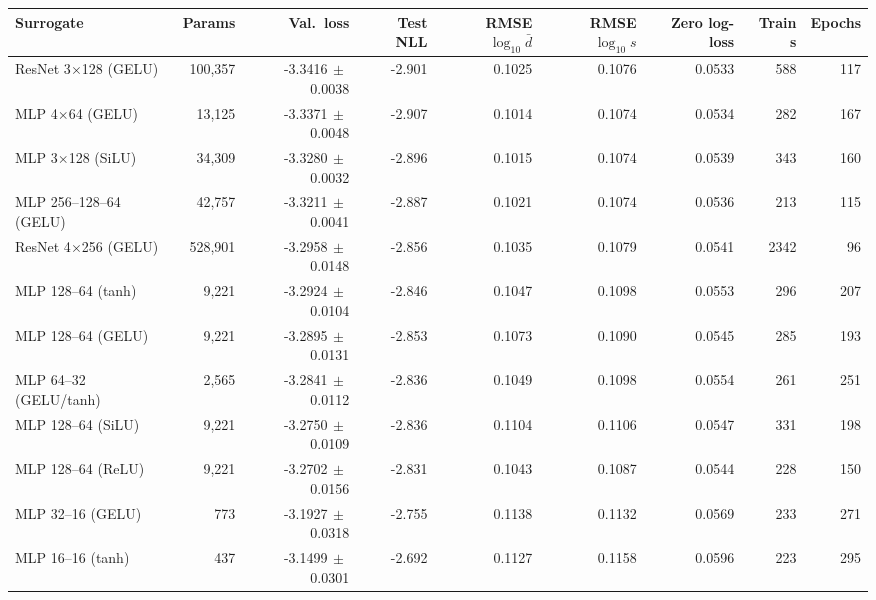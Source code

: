 \begin{tabular}{lrrrrrrrr}
\toprule
Surrogate & Params & Val.\ loss & Test NLL & RMSE $\log_{10}\bar d$ & RMSE $\log_{10}s$ & Zero log-loss & Train s & Epochs \\
\midrule
ResNet 3$\times$128 (GELU) & 100{,}357 & -3.3416$\,\pm\,$0.0038 & -2.901 & 0.1025 & 0.1076 & 0.0533 & 588 & 117 \\
MLP 4$\times$64 (GELU) & 13{,}125 & -3.3371$\,\pm\,$0.0048 & -2.907 & 0.1014 & 0.1074 & 0.0534 & 282 & 167 \\
MLP 3$\times$128 (SiLU) & 34{,}309 & -3.3280$\,\pm\,$0.0032 & -2.896 & 0.1015 & 0.1074 & 0.0539 & 343 & 160 \\
MLP 256--128--64 (GELU) & 42{,}757 & -3.3211$\,\pm\,$0.0041 & -2.887 & 0.1021 & 0.1074 & 0.0536 & 213 & 115 \\
ResNet 4$\times$256 (GELU) & 528{,}901 & -3.2958$\,\pm\,$0.0148 & -2.856 & 0.1035 & 0.1079 & 0.0541 & 2342 & 96 \\
MLP 128--64 (tanh) & 9{,}221 & -3.2924$\,\pm\,$0.0104 & -2.846 & 0.1047 & 0.1098 & 0.0553 & 296 & 207 \\
MLP 128--64 (GELU) & 9{,}221 & -3.2895$\,\pm\,$0.0131 & -2.853 & 0.1073 & 0.1090 & 0.0545 & 285 & 193 \\
MLP 64--32 (GELU/tanh) & 2{,}565 & -3.2841$\,\pm\,$0.0112 & -2.836 & 0.1049 & 0.1098 & 0.0554 & 261 & 251 \\
MLP 128--64 (SiLU) & 9{,}221 & -3.2750$\,\pm\,$0.0109 & -2.836 & 0.1104 & 0.1106 & 0.0547 & 331 & 198 \\
MLP 128--64 (ReLU) & 9{,}221 & -3.2702$\,\pm\,$0.0156 & -2.831 & 0.1043 & 0.1087 & 0.0544 & 228 & 150 \\
MLP 32--16 (GELU) & 773 & -3.1927$\,\pm\,$0.0318 & -2.755 & 0.1138 & 0.1132 & 0.0569 & 233 & 271 \\
MLP 16--16 (tanh) & 437 & -3.1499$\,\pm\,$0.0301 & -2.692 & 0.1127 & 0.1158 & 0.0596 & 223 & 295 \\
\bottomrule
\end{tabular}
